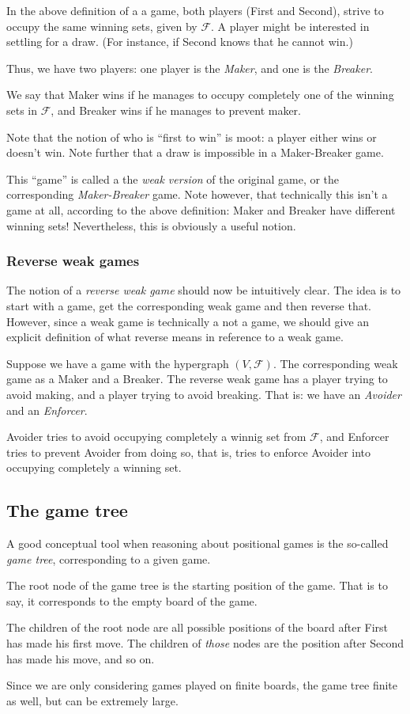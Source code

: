 In the above definition of a a game, both players (First and Second), strive to occupy the same winning sets, given by $\mathcal F$. A player might be interested in settling for a draw. (For instance, if Second knows that he cannot win.) 

Thus, we have two players: one player is the \emph{Maker}, and one is the \emph{Breaker}.

We say that Maker wins if he manages to occupy completely one of the winning sets in $\mathcal F$, and Breaker wins if he manages to prevent maker.

Note that the notion of who is ``first to win'' is moot: a player either wins or doesn't win.
Note further that a draw is impossible in a Maker-Breaker game.

This ``game'' is called a the \emph{weak version} of the original game, or the corresponding \emph{Maker-Breaker} game.
Note however, that technically this isn't a game at all, according to the above definition: Maker and Breaker have different winning sets! Nevertheless, this is obviously a useful notion.

\subsubsection{Reverse weak games}

The notion of a \emph{reverse weak game} should now be intuitively clear.
The idea is to start with a game, get the corresponding weak game and then reverse that.
However, since a weak game is technically a not a game, we should give an explicit definition of what reverse means in reference to a weak game.

Suppose we have a game with the hypergraph $(V,\mathcal F)$.
The corresponding weak game as a Maker and a Breaker.
The reverse weak game has a player trying to avoid making, and a player trying to avoid breaking.
That is: we have an \emph{Avoider} and an \emph{Enforcer}.

Avoider tries to avoid occupying completely a winnig set from $\mathcal F$, and Enforcer tries to prevent Avoider from doing so, that is, tries to enforce Avoider into occupying completely a winning set.


\subsection{The game tree}

A good conceptual tool when reasoning about positional games is the so-called \emph{game tree}, corresponding to a given game.

The root node of the game tree is the starting position of the game.
That is to say, it corresponds to the empty board of the game.

The children of the root node are all possible positions of the board after First has made his first move.
The children of \emph{those} nodes are the position after Second has made his move, and so on.

Since we are only considering games played on finite boards, the game tree finite as well, but can be extremely large.
